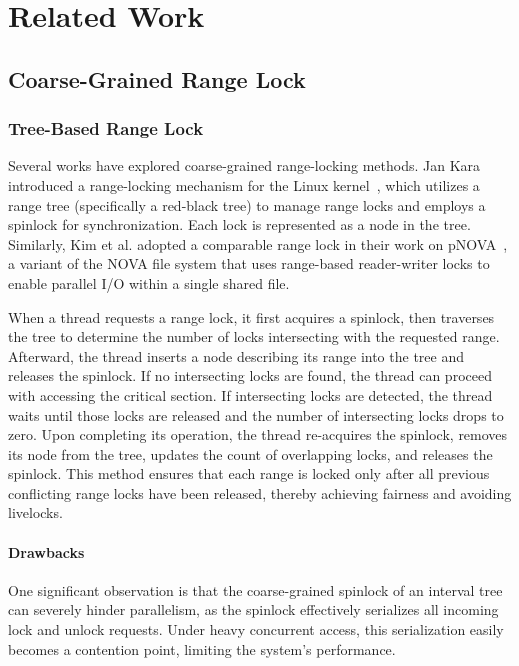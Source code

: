 \chapter{Related Work}\label{chapter:relatedwork}

\section{Coarse-Grained Range Lock}

\subsection{Tree-Based Range Lock}\label{subsec:treebased}

Several works have explored coarse-grained range-locking methods. Jan Kara introduced a range-locking mechanism for the Linux kernel~\parencite{linuxRangeLockImpl2013}, which utilizes a range tree (specifically a red-black tree) to manage range locks and employs a spinlock for synchronization. Each lock is represented as a node in the tree. Similarly, Kim et al. adopted a comparable range lock in their work on pNOVA~\parencite{kim2019pnova}, a variant of the NOVA file system that uses range-based reader-writer locks to enable parallel I/O within a single shared file.

When a thread requests a range lock, it first acquires a spinlock, then traverses the tree to determine the number of locks intersecting with the requested range. Afterward, the thread inserts a node describing its range into the tree and releases the spinlock. If no intersecting locks are found, the thread can proceed with accessing the critical section. If intersecting locks are detected, the thread waits until those locks are released and the number of intersecting locks drops to zero. Upon completing its operation, the thread re-acquires the spinlock, removes its node from the tree, updates the count of overlapping locks, and releases the spinlock. This method ensures that each range is locked only after all previous conflicting range locks have been released, thereby achieving fairness and avoiding livelocks.

\subsubsection*{Drawbacks}

One significant observation is that the coarse-grained spinlock of an interval tree can severely hinder parallelism, as the spinlock effectively serializes all incoming lock and unlock requests. Under heavy concurrent access, this serialization easily becomes a contention point, limiting the system's performance.

